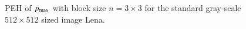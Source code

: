 \documentclass[review,3p,10pt,sort&compress]{elsarticle}
\begin{document}
\begin{figure}
{\begin{minipage}[t]{0.32\linewidth}
    \end{minipage}
}
\qquad
{}		
\centering
\caption{PEH of $p_{\rm max}$ with block size $n = 3 \times 3$ for the standard gray-scale $512 \times 512$ sized image Lena.}
\label{Fig.PVOIPVO}
\end{figure}
\end{document}
